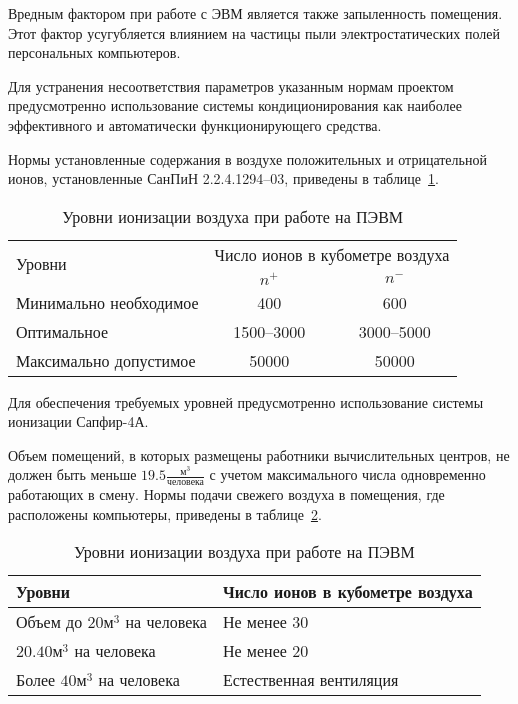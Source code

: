 Вредным фактором при работе с ЭВМ является также запыленность помещения. Этот фактор усугубляется влиянием на частицы пыли электростатических полей персональных компьютеров.

Для устранения несоответствия параметров указанным нормам проектом предусмотренно использование системы кондиционирования как наиболее эффективного и автоматически функционирующего средства.

Нормы установленные содержания в воздухе положительных и отрицательной ионов, установленные СанПиН 2.2.4.1294--03, приведены в таблице~\ref{tab:ions}.

\begin{table}[ht]
\caption{Уровни ионизации воздуха при работе на ПЭВМ}
\begin{tabular}{|l|c|c|}
\hline
\multirow{2}{*}{Уровни} & \multicolumn{2}{l|}{Число ионов в кубометре воздуха}\\
\cline{2-3}
&$n^+$&$n^-$\\
\hline
Минимально необходимое & 400 & 600 \\
\hline
Оптимальное & 1500--3000 & 3000--5000 \\
\hline
Максимально допустимое & 50000 & 50000 \\
\hline
\end{tabular}
\label{tab:ions}
\end{table}

Для обеспечения требуемых уровней предусмотренно использование системы ионизации Сапфир-4А.

Объем помещений, в которых размещены работники вычислительных центров, не должен быть меньше $19.5 \frac{\text{м}^3}{\text{человека}}$ с учетом максимального числа одновременно работающих в смену. Нормы подачи свежего воздуха в помещения, где расположены компьютеры, приведены в таблице~\ref{tab:air}.

\begin{table}[ht]
\caption{Уровни ионизации воздуха при работе на ПЭВМ}
	\begin{tabular}{|l|l|}
	\hline
	Уровни & Число ионов в кубометре воздуха \\ 
	\hline
	Объем до $20 {\text{м}^3}$ на человека & Не менее 30 \\
	\hline
	$20.40 {\text{м}^3}$ на человека & Не менее 20 \\
	\hline
	Более $40 {\text{м}^3}$ на человека & Естественная вентиляция \\
	\hline
	\end{tabular}
\label{tab:air}
\end{table}

